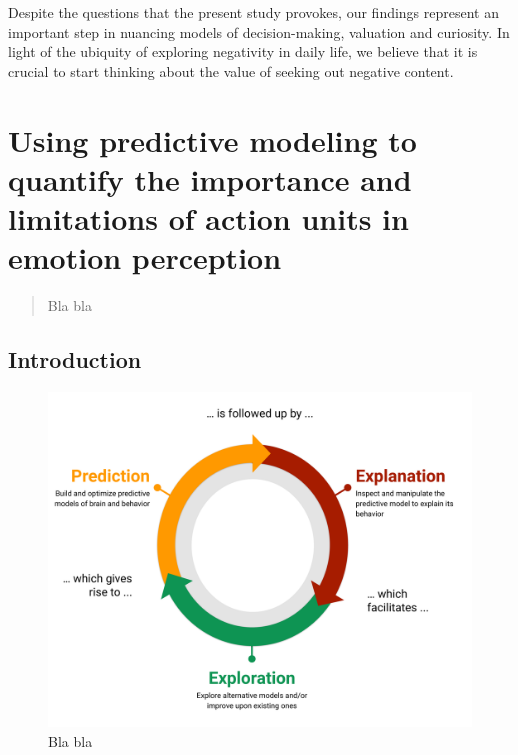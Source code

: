 \documentclass[11pt,american,a4paper,oneside,]{memoir} %
\begin{document}
Despite the questions that the present study provokes, our findings represent an important step in nuancing models of decision-making, valuation and curiosity. In light of the ubiquity of exploring negativity in daily life, we believe that it is crucial to start thinking about the value of seeking out negative content.

\hypertarget{hypothesis-kernel-analysis}{%
\chapter{Using predictive modeling to quantify the importance and limitations of action units in emotion perception}\label{hypothesis-kernel-analysis}}


\newpage
\normalsize

\begin{abstract}
Bla bla
\end{abstract} \newpage

\hypertarget{hka-introduction}{%
\section{Introduction}\label{hka-introduction}}

\begin{figure}
\centering
\includegraphics{_bookdown_files/hypothesis-kernel-analysis-files/figures/figure_1.pdf}
\caption{\label{fig:fig-hka-1}Bla bla}
\end{figure}
\end{document}
